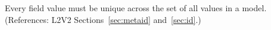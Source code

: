 Every  field value must be unique across the set of all
 values in a model.  (References: L2V2
Sections~\ref{sec:metaid} and~\ref{sec:id}.)
